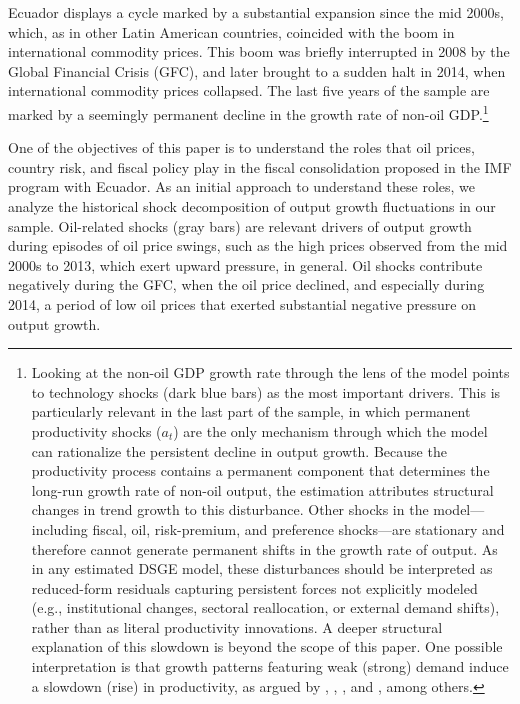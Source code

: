 \documentclass[12pt]{article}
\begin{document}
Ecuador displays a cycle marked by a substantial expansion since the mid 2000s, which, as in other Latin American countries, coincided with the boom in international commodity prices. This boom was briefly interrupted in 2008 by the Global Financial Crisis (GFC), and later brought to a sudden halt in 2014, when international commodity prices collapsed. The last five years of the sample are marked by a seemingly permanent decline in the growth rate of non-oil GDP.\footnote{Looking at the non-oil GDP growth rate through the lens of the model points to technology shocks (dark blue bars) as the most important drivers. This is particularly relevant in the last part of the sample, in which permanent productivity shocks ($a_t$) are the only mechanism through which the model can rationalize the persistent decline in output growth. Because the productivity process contains a permanent component that determines the long-run growth rate of non-oil output, the estimation attributes structural changes in trend growth to this disturbance. Other shocks in the model---including fiscal, oil, risk-premium, and preference shocks---are stationary and therefore cannot generate permanent shifts in the growth rate of output. As in any estimated DSGE model, these disturbances should be interpreted as reduced-form residuals capturing persistent forces not explicitly modeled (e.g., institutional changes, sectoral reallocation, or external demand shifts), rather than as literal productivity innovations. A deeper structural explanation of this slowdown is beyond the scope of this paper. One possible interpretation is that growth patterns featuring weak (strong) demand induce a slowdown (rise) in productivity, as argued by \citet{stadler1990business}, \citet{anzoategui2019endogenous}, \citet{jorda2020long}, and \citet{furlanetto2025estimating}, among others.}

One of the objectives of this paper is to understand the roles that oil prices, country risk, and fiscal policy play in the fiscal consolidation proposed in the IMF program with Ecuador. As an initial approach to understand these roles, we analyze the historical shock decomposition of output growth fluctuations in our sample. Oil-related shocks (gray bars) are relevant drivers of output growth during episodes of oil price swings, such as the high prices observed from the mid 2000s to 2013, which exert upward pressure, in general. Oil shocks contribute negatively during the GFC, when the oil price declined, and especially during 2014, a period of low oil prices that exerted substantial negative pressure on output growth. 
\end{document}
